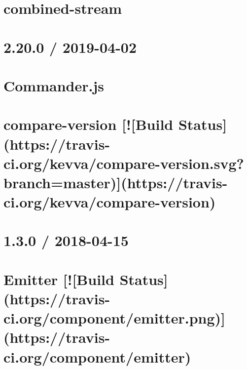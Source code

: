 \documentclass[twoside]{book}
\newcommand{\+}{\discretionary{\mbox{\scriptsize$\hookleftarrow$}}{}{}}
\begin{document}
\chapter{combined-\/stream}
\label{md_dsmacc_vis_degree_node_modules_combined-stream_Readme}

\chapter{2.20.0 / 2019-\/04-\/02}
\label{md_dsmacc_vis_degree_node_modules_commander_CHANGELOG}

\chapter{Commander.\+js}
\label{md_dsmacc_vis_degree_node_modules_commander_Readme}

\chapter{compare-\/version \mbox{[}!\mbox{[}Build Status\mbox{]}(https\+://travis-\/ci.org/kevva/compare-\/version.svg?branch=master)\mbox{]}(https\+://travis-\/ci.org/kevva/compare-\/version)}
\label{md_dsmacc_vis_degree_node_modules_compare-version_README}

\chapter{1.3.0 / 2018-\/04-\/15}
\label{md_dsmacc_vis_degree_node_modules_component-emitter_History}

\chapter{Emitter \mbox{[}!\mbox{[}Build Status\mbox{]}(https\+://travis-\/ci.org/component/emitter.png)\mbox{]}(https\+://travis-\/ci.org/component/emitter)}
\label{md_dsmacc_vis_degree_node_modules_component-emitter_Readme}

\end{document}
